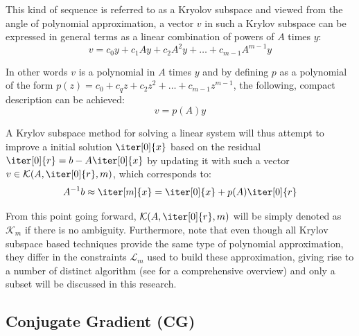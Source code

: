\noindent This kind of sequence is referred to as a Kryolov subspace and viewed from the angle of polynomial approximation, a vector $v$ in such a Krylov subspace can be expressed in general terms as a linear combination of powers of $A$ times $y$:
\begin{equation}
\label{eqn:poly1}
    v = c_0y+c_1Ay+c_2A^2y+\dots+c_{m-1}A^{m-1}y
\end{equation}

\noindent In other words $v$ is a polynomial in $A$ times $y$ and by defining $p$ as a polynomial of the form $p(z) = c_0+c_qz+c_2z^2+\dots+c_{m-1}z^{m-1}$, the following, compact description can be achieved:
\begin{equation}
\label{eqn:poly2}
v=p(A)y  
\end{equation}

\noindent A Krylov subspace method for solving a linear system will thus attempt to improve a initial solution $\iter[0]{x}$ based on the residual $\iter[0]{r} = b-A\iter[0]{x}$ by updating it with such a vector $v \in \mathcal{K}(A, \iter[0]{r},m)$, which corresponds to:
\begin{equation}
    A^{-1}b \approx \iter[m]{x} = \iter[0]{x}+p(A)\iter[0]{r}
\end{equation}

\noindent From this point going forward, $\mathcal{K}(A, \iter[0]{r},m)$ will be simply denoted as $\mathcal{K}_m$ if there is no ambiguity. Furthermore, note that even though all Krylov subspace based techniques provide the same type of polynomial approximation, they differ in the constraints $\mathcal{L}_m$ used to build these approximation, giving rise to a number of distinct algorithm (see \cite{saad_iterative_2003} for a comprehensive overview) and only a subset will be discussed in this research.



\subsection{Conjugate Gradient (CG)}
\label{sec:conjugate_gradient}

